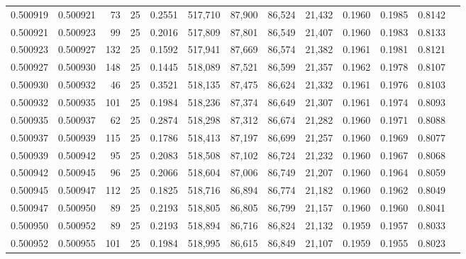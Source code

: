 \begin{tabular}{rrrrrrrrrrrrr}
0.500919 & 0.500921 &  73 &  25 &                                     0.2551 & 517,710 &  87,900 &  86,524 &  21,432 & 0.1960 & 0.1985 & 0.8142 \\
0.500921 & 0.500923 &  99 &  25 &                                     0.2016 & 517,809 &  87,801 &  86,549 &  21,407 & 0.1960 & 0.1983 & 0.8133 \\
0.500923 & 0.500927 & 132 &  25 &                                     0.1592 & 517,941 &  87,669 &  86,574 &  21,382 & 0.1961 & 0.1981 & 0.8121 \\
0.500927 & 0.500930 & 148 &  25 &                                     0.1445 & 518,089 &  87,521 &  86,599 &  21,357 & 0.1962 & 0.1978 & 0.8107 \\
0.500930 & 0.500932 &  46 &  25 &                                     0.3521 & 518,135 &  87,475 &  86,624 &  21,332 & 0.1961 & 0.1976 & 0.8103 \\
0.500932 & 0.500935 & 101 &  25 &                                     0.1984 & 518,236 &  87,374 &  86,649 &  21,307 & 0.1961 & 0.1974 & 0.8093 \\
0.500935 & 0.500937 &  62 &  25 &                                     0.2874 & 518,298 &  87,312 &  86,674 &  21,282 & 0.1960 & 0.1971 & 0.8088 \\
0.500937 & 0.500939 & 115 &  25 &                                     0.1786 & 518,413 &  87,197 &  86,699 &  21,257 & 0.1960 & 0.1969 & 0.8077 \\
0.500939 & 0.500942 &  95 &  25 &                                     0.2083 & 518,508 &  87,102 &  86,724 &  21,232 & 0.1960 & 0.1967 & 0.8068 \\
0.500942 & 0.500945 &  96 &  25 &                                     0.2066 & 518,604 &  87,006 &  86,749 &  21,207 & 0.1960 & 0.1964 & 0.8059 \\
0.500945 & 0.500947 & 112 &  25 &                                     0.1825 & 518,716 &  86,894 &  86,774 &  21,182 & 0.1960 & 0.1962 & 0.8049 \\
0.500947 & 0.500950 &  89 &  25 &                                     0.2193 & 518,805 &  86,805 &  86,799 &  21,157 & 0.1960 & 0.1960 & 0.8041 \\
0.500950 & 0.500952 &  89 &  25 &                                     0.2193 & 518,894 &  86,716 &  86,824 &  21,132 & 0.1959 & 0.1957 & 0.8033 \\
0.500952 & 0.500955 & 101 &  25 &                                     0.1984 & 518,995 &  86,615 &  86,849 &  21,107 & 0.1959 & 0.1955 & 0.8023 \\

\end{tabular}
